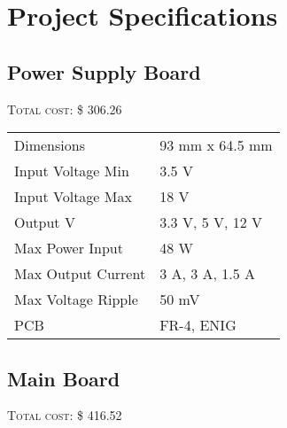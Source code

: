 \chapter{Project Specifications}





\section{Power Supply Board}
\textsc{Total cost: \$ 306.26} \\

\begin{tabular}{p{} p{}}
\hline
Dimensions                & 93 mm x 64.5 mm \\
Input Voltage Min      & 3.5 V \\
Input Voltage Max     & 18 V \\
Output V                   & 3.3 V, 5 V, 12 V \\
Max Power Input      & 48 W \\
Max Output Current & 3 A, 3 A, 1.5 A \\
Max Voltage Ripple   & 50 mV \\
PCB                          & FR-4, ENIG \\
\hline
\end{tabular}

\section{Main Board}
\textsc{Total cost: \$ 416.52} \\

